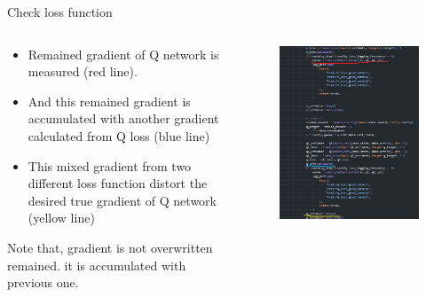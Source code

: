 \documentclass[8pt]{beamer}
\begin{document}
\begin{frame}{Check loss function}
    \begin{columns}
        \begin{column}[]{0.4\textwidth}
            \begin{itemize}
                \item Remained gradient of Q network is measured (red line). 
                \item And this remained gradient is accumulated with another gradient calculated from Q loss (blue line)
                \item This mixed gradient from two different loss function distort the desired true gradient of Q network (yellow line)
            \end{itemize}
            Note that, gradient is not overwritten remained. it is accumulated with previous one.
        \end{column}
        \begin{column}{0.6\textwidth}
            \begin{figure}
                \includegraphics[width=1.0\textwidth]{VlossQloss.png}
            \end{figure}
        \end{column}
    \end{columns}
\end{frame}
\end{document}
